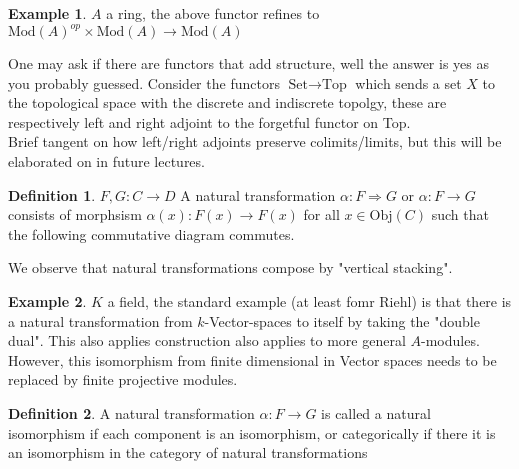 \documentclass{article}
\theoremstyle{definition}
\newtheorem{example}{Example}[section]
\theoremstyle{definition}
\newtheorem{definition}{Definition}[section]
\theoremstyle{remark}
\begin{document}
\begin{example}
	$A$ a ring, the above functor refines to $\text{Mod}(A)^{op} \times \text{Mod}(A) \to \text{Mod}(A)$
\end{example}

One may ask if there are functors that add structure, well the answer is yes as you probably guessed.
Consider the functors $\text{Set} \to \text{Top}$ which sends a set $X$ to the topological space with the discrete and indiscrete topolgy, these are respectively left and right adjoint to the forgetful functor on  Top.\\

Brief tangent on how left/right adjoints preserve colimits/limits, but this will be elaborated on in future lectures.

\begin{definition}
	$F,G: C \to D$ A natural transformation $\alpha: F \Rightarrow G$ or $\alpha: F \to G$ consists of morphsism $\alpha(x): F(x) \to F(x)$ for all $x \in \text{Obj}(C)$ such that the following commutative diagram commutes.
\end{definition}
We observe that natural transformations compose by "vertical stacking".

\begin{example}
	$K$ a field, the standard example (at least fomr Riehl) is that there is a natural transformation from $k$-Vector-spaces to itself by taking the "double dual".
	This also applies construction also applies to more general $A$-modules. 
	However, this isomorphism from finite dimensional in Vector spaces needs to be replaced by finite projective modules.
\end{example}

 \begin{definition}
 	A natural transformation $\alpha: F \to G$ is called a natural isomorphism if each component is an isomorphism, or categorically if there it is an isomorphism in the category of natural transformations
 \end{definition}
 
\end{document}
